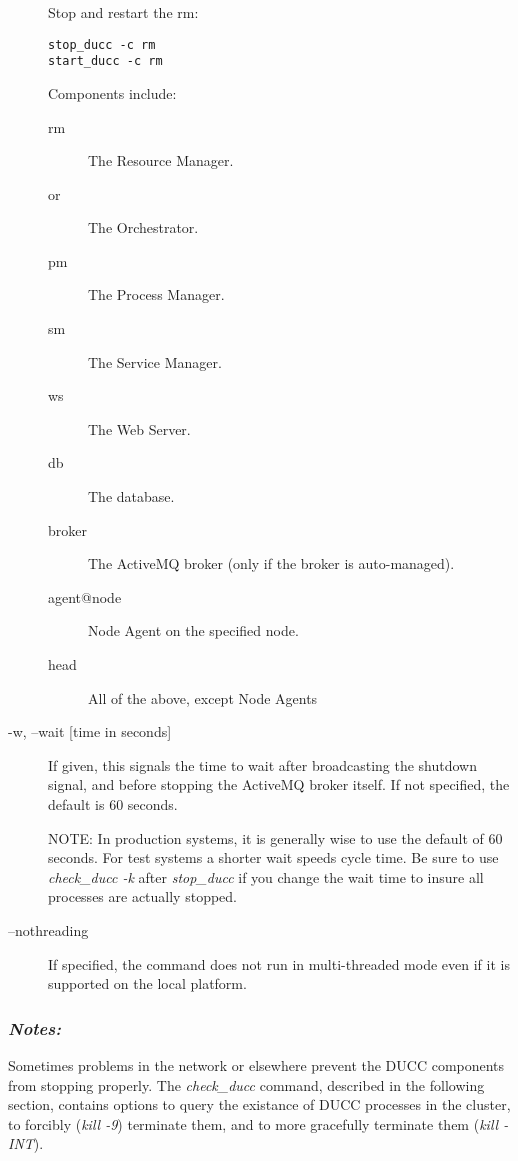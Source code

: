 \begin{description}
            Stop and restart the rm: 
\begin{verbatim}
stop_ducc -c rm 
start_ducc -c rm
\end{verbatim}
            
            Components include: 
            \begin{description}
              \item[rm] The Resource Manager.                 
              \item[or] The Orchestrator.                 
              \item[pm] The Process Manager.                 
              \item[sm] The Service Manager.                 
              \item[ws] The Web Server.                 
              \item[db] The database.
              \item[broker] The ActiveMQ broker (only if the broker is auto-managed).
              \item[agent@node] Node Agent on the specified node.
              \item[head] All of the above, except Node Agents
              \end{description}

          \item[-w, --wait {[time in seconds]}] If given, this signals the time to wait
            after broadcasting the shutdown signal, and before stopping the ActiveMQ broker itself.
            If not specified, the default is 60 seconds.  

            NOTE: In production systems, it is generally wise to use the default of 60 seconds.  For
            test systems a shorter wait speeds cycle time.  Be sure to use {\em check\_ducc -k} after
            {\em stop\_ducc} if you change the wait time to insure all processes are actually stopped.

          \item[--nothreading] If specified, the command does not run in multi-threaded mode
            even if it is supported on the local platform.
              
       \end{description}
            
   \subsubsection{{\em Notes:}}
   Sometimes problems in the network or elsewhere prevent the DUCC components from stopping properly.  The
   {\em check\_ducc} command, described in the following section, contains options to query the
   existance of DUCC processes in the cluster, to forcibly ({\em kill -9}) terminate them, and to
   more gracefully terminate them ({\em kill -INT}).
          


